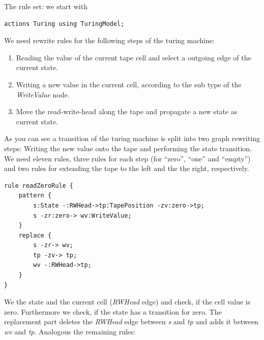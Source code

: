\documentclass[a4paper,11pt]{report}
\begin{document}
The rule set: we start with
\lstset{language=grgenactions}
\begin{lstlisting}[name=grg] 
actions Turing using TuringModel;
\end{lstlisting}
We need rewrite rules for the following steps of the turing machine:
\begin{enumerate}
  \item Reading the value of the current tape cell and select a outgoing edge of the current state.
  \item Writing a new value in the current cell, according to the sub type of the \emph{WriteValue} node.
  \item Move the read-write-head along the tape and propagate a new state as current state. 
\end{enumerate}
As you can see a transition of the turing machine is split into two graph rewriting steps: Writing the new value onto the tape and performing the state transition. We need eleven rules, three rules for each step (for ``zero'', ``one'' and ``empty'') and two rules for extending the tape to the left and the the right, respectively.
\begin{lstlisting}[name=grg] 
rule readZeroRule {
	pattern {
		s:State -:RWHead->tp:TapePosition -zv:zero->tp;
		s -zr:zero-> wv:WriteValue;
	}
	replace {
		s -zr-> wv;
		tp -zv-> tp;
		wv -:RWHead->tp;
	}
}      
\end{lstlisting}
We the state and the current cell (\emph{RWHead} edge) and check, if the cell value is zero. Furthermore we check, if the state has a transition for zero. The replacement part deletes the \emph{RWHead} edge between \emph{s} and \emph{tp} and adds it between \emph{wv} and \emph{tp}. Analogous the remaining rules:
\end{document}
